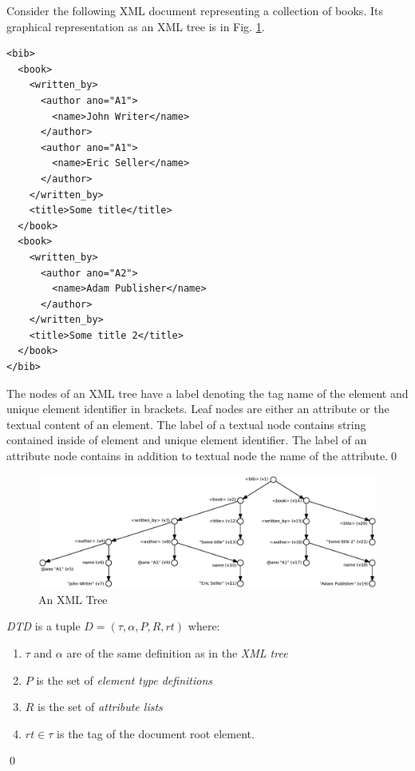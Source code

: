 \begin{example}\label{example1ref}
Consider the following XML document representing a collection of books. Its graphical representation as an XML tree is in Fig. \ref{example1}.
\begin{verbatim}
<bib>
  <book>
    <written_by>
      <author ano="A1">
        <name>John Writer</name>
      </author>
      <author ano="A1">
        <name>Eric Seller</name>
      </author>
    </written_by>
    <title>Some title</title>
  </book>
  <book>
    <written_by>
      <author ano="A2">
        <name>Adam Publisher</name>
      </author>
    </written_by>
    <title>Some title 2</title>
  </book>
</bib>
\end{verbatim}

The nodes of an XML tree have a label denoting the tag name of the element and unique element identifier in brackets. Leaf nodes are either an attribute or the textual content of an element. The label of a textual node contains string contained inside of element and unique element identifier. The label of an attribute node contains in addition to textual node the name of the attribute.\qed
\end{example}

\begin{figure}[h]
    \centering\includegraphics[width=\textwidth]{example1-new}
	\caption{An XML Tree} \label{example1}
\end{figure}

\begin{define}[DTD]\label{dtdDef}
{\sl DTD} is a tuple $D = (\tau, \alpha, P, R, rt)$ where:
\renewcommand{\labelenumi}{\roman{enumi})}
\begin{enumerate}
	\item $\tau$ and $\alpha$ are of the same definition as in the \emph{XML tree}
    \item $P$ is the set of \emph{element type definitions}
    \item $R$ is the set of \emph{attribute lists}
    \item $rt \in \tau$ is the tag of the document root element.
\end{enumerate}
\qed
\end{define}

